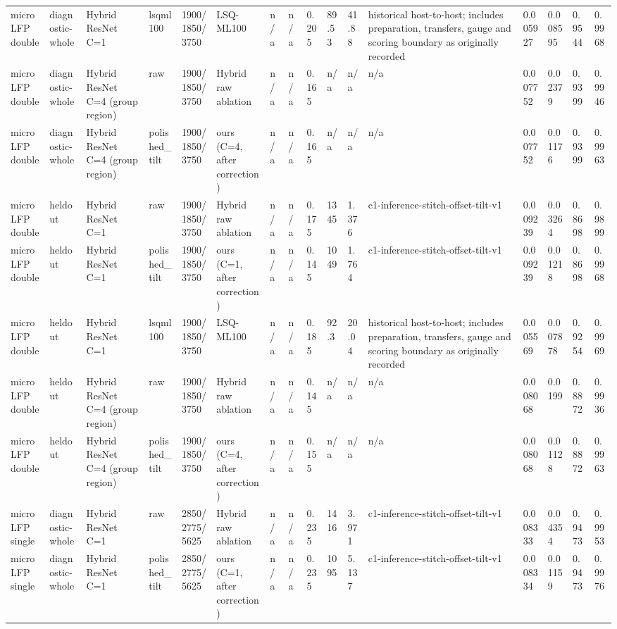 \begin{tabular}{llllllllllllllll}
microLFP double & diagnostic-whole & Hybrid ResNet C=1 & lsqml100 & 1900/1850/3750 & LSQ-ML100 & n/a & n/a & 0.205 & 89.53 & 41.88 & historical host-to-host; includes preparation, transfers, gauge and scoring boundary as originally recorded & 0.005927 & 0.008595 & 0.9544 & 0.9968 \\
microLFP double & diagnostic-whole & Hybrid ResNet C=4 (group region) & raw & 1900/1850/3750 & Hybrid raw ablation & n/a & n/a & 0.165 & n/a & n/a & n/a & 0.007752 & 0.02379 & 0.9399 & 0.9946 \\
microLFP double & diagnostic-whole & Hybrid ResNet C=4 (group region) & polished\_tilt & 1900/1850/3750 & ours (C=4, after correction) & n/a & n/a & 0.165 & n/a & n/a & n/a & 0.007752 & 0.01176 & 0.9399 & 0.9963 \\
microLFP double & heldout & Hybrid ResNet C=1 & raw & 1900/1850/3750 & Hybrid raw ablation & n/a & n/a & 0.175 & 1345 & 1.376 & c1-inference-stitch-offset-tilt-v1 & 0.009239 & 0.03264 & 0.8698 & 0.9899 \\
microLFP double & heldout & Hybrid ResNet C=1 & polished\_tilt & 1900/1850/3750 & ours (C=1, after correction) & n/a & n/a & 0.145 & 1049 & 1.764 & c1-inference-stitch-offset-tilt-v1 & 0.009239 & 0.01218 & 0.8698 & 0.9968 \\
microLFP double & heldout & Hybrid ResNet C=1 & lsqml100 & 1900/1850/3750 & LSQ-ML100 & n/a & n/a & 0.185 & 92.3 & 20.04 & historical host-to-host; includes preparation, transfers, gauge and scoring boundary as originally recorded & 0.005569 & 0.007878 & 0.9254 & 0.9969 \\
microLFP double & heldout & Hybrid ResNet C=4 (group region) & raw & 1900/1850/3750 & Hybrid raw ablation & n/a & n/a & 0.145 & n/a & n/a & n/a & 0.008068 & 0.0199 & 0.8872 & 0.9936 \\
microLFP double & heldout & Hybrid ResNet C=4 (group region) & polished\_tilt & 1900/1850/3750 & ours (C=4, after correction) & n/a & n/a & 0.155 & n/a & n/a & n/a & 0.008068 & 0.01128 & 0.8872 & 0.9963 \\
microLFP single & diagnostic-whole & Hybrid ResNet C=1 & raw & 2850/2775/5625 & Hybrid raw ablation & n/a & n/a & 0.235 & 1416 & 3.971 & c1-inference-stitch-offset-tilt-v1 & 0.008333 & 0.04354 & 0.9473 & 0.9953 \\
microLFP single & diagnostic-whole & Hybrid ResNet C=1 & polished\_tilt & 2850/2775/5625 & ours (C=1, after correction) & n/a & n/a & 0.235 & 1095 & 5.137 & c1-inference-stitch-offset-tilt-v1 & 0.008334 & 0.01159 & 0.9473 & 0.9976 \\

\end{tabular}
